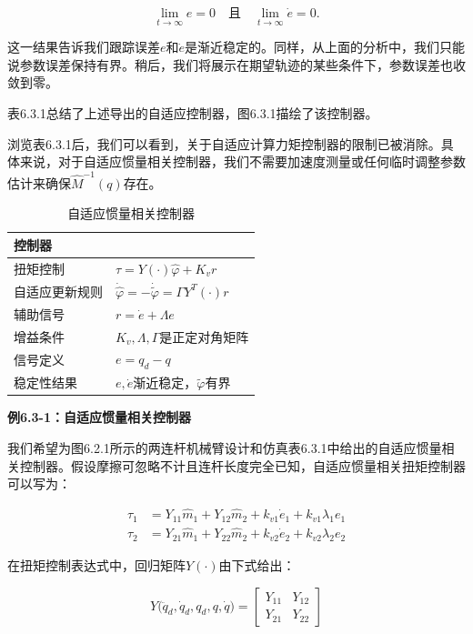 \documentclass[12pt,a4paper]{ctexart}
\begin{document}
\begin{equation}\label{eq:6.3.20}
\lim_{t \to \infty} e = 0 \quad \text{且} \quad \lim_{t \to \infty} \dot{e} = 0.
\end{equation}

这一结果告诉我们跟踪误差$e$和$\dot{e}$是渐近稳定的。同样，从上面的分析中，我们只能说参数误差保持有界。稍后，我们将展示在期望轨迹的某些条件下，参数误差也收敛到零。

表6.3.1总结了上述导出的自适应控制器，图6.3.1描绘了该控制器。

浏览表6.3.1后，我们可以看到，关于自适应计算力矩控制器的限制已被消除。具体来说，对于自适应惯量相关控制器，我们不需要加速度测量或任何临时调整参数估计来确保$\hat{M}^{-1}(q)$存在。

\begin{table}[H]
\centering
\caption{自适应惯量相关控制器}
\begin{tabular}{|l|l|}
\hline
\textbf{控制器} & \\ \hline
扭矩控制 & $\tau = Y(\cdot)\hat{\varphi} + K_v r$ \\ \hline
自适应更新规则 & $\dot{\hat{\varphi}} = -\dot{\tilde{\varphi}} = \Gamma Y^T (\cdot) r$ \\ \hline
辅助信号 & $r = \dot{e} + \Lambda e$ \\ \hline
增益条件 & $K_v, \Lambda, \Gamma$是正定对角矩阵 \\ \hline
信号定义 & $e = q_d - q$ \\ \hline
稳定性结果 & $e, \dot{e}$渐近稳定，$\tilde{\varphi}$有界 \\ \hline
\end{tabular}
\end{table}

\textbf{例6.3-1：自适应惯量相关控制器}

我们希望为图6.2.1所示的两连杆机械臂设计和仿真表6.3.1中给出的自适应惯量相关控制器。假设摩擦可忽略不计且连杆长度完全已知，自适应惯量相关扭矩控制器可以写为：

\begin{align}
\tau_1 &= Y_{11}\hat{m}_1 + Y_{12}\hat{m}_2 + k_{v1}\dot{e}_1 + k_{v1}\lambda_1 e_1 \tag{1} \\
\tau_2 &= Y_{21}\hat{m}_1 + Y_{22}\hat{m}_2 + k_{v2}\dot{e}_2 + k_{v2}\lambda_2 e_2 \tag{2}
\end{align}

在扭矩控制表达式中，回归矩阵$Y(\cdot)$由下式给出：

\begin{equation}
Y\bigl(\ddot{q}_d, \dot{q}_d, q_d, q, \dot{q}\bigr) = \begin{bmatrix} Y_{11} & Y_{12} \\ Y_{21} & Y_{22} \end{bmatrix} \tag{3}
\end{equation}
\end{document}
